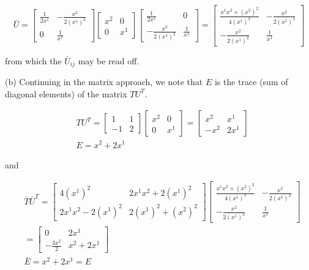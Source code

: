 \documentclass[10pt]{article}
\begin{document}
$$
\bar{U}=\left[\begin{array}{cc}
\frac{1}{2 x^{1}} & -\frac{x^{2}}{2\left(x^{1}\right)^{2}} \\
0 & \frac{1}{x^{1}}
\end{array}\right]\left[\begin{array}{cc}
x^{2} & 0 \\
0 & x^{1}
\end{array}\right]\left[\begin{array}{rr}
\frac{1}{2 x^{1}} & 0 \\
-\frac{x^{2}}{2\left(x^{1}\right)^{2}} & \frac{1}{x^{1}}
\end{array}\right]=\left[\begin{array}{cc}
\frac{x^{1} x^{2}+\left(x^{2}\right)^{2}}{4\left(x^{1}\right)^{3}} & -\frac{x^{2}}{2\left(x^{1}\right)^{2}} \\
-\frac{x^{2}}{2\left(x^{1}\right)^{2}} & \frac{1}{x^{1}}
\end{array}\right]
$$

from which the $\bar{U}_{i j}$ may be read off.

(b) Continuing in the matrix approach, we note that $E$ is the trace (sum of diagonal elements) of the matrix $T U^{T}$.

$$
\begin{aligned}
& T U^{T}=\left[\begin{array}{rr}
1 & 1 \\
-1 & 2
\end{array}\right]\left[\begin{array}{cc}
x^{2} & 0 \\
0 & x^{1}
\end{array}\right]=\left[\begin{array}{rr}
x^{2} & x^{1} \\
-x^{2} & 2 x^{1}
\end{array}\right] \\
& E=x^{2}+2 x^{1}
\end{aligned}
$$

and

$$
\begin{aligned}
& \bar{T} \bar{U}^{T}=\left[\begin{array}{cc}
4\left(x^{1}\right)^{2} & 2 x^{1} x^{2}+2\left(x^{1}\right)^{2} \\
2 x^{1} x^{2}-2\left(x^{1}\right)^{2} & 2\left(x^{1}\right)^{2}+\left(x^{2}\right)^{2}
\end{array}\right]\left[\begin{array}{cc}
\frac{x^{1} x^{2}+\left(x^{2}\right)^{2}}{4\left(x^{1}\right)^{3}} & -\frac{x^{2}}{2\left(x^{1}\right)^{2}} \\
-\frac{x^{2}}{2\left(x^{1}\right)^{2}} & \frac{1}{x^{1}}
\end{array}\right] \\
&=\left[\begin{array}{cc}
0 & 2 x^{1} \\
-\frac{3 x^{2}}{2} & x^{2}+2 x^{1}
\end{array}\right] \\
& \bar{E}=x^{2}+2 x^{1}=E
\end{aligned}
$$
\end{document}
